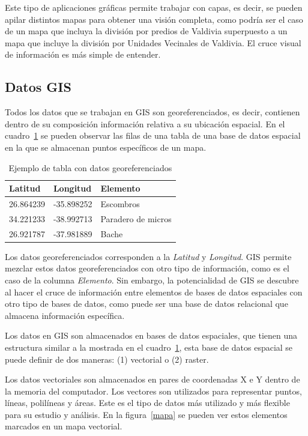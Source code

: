 Este tipo de aplicaciones gráficas permite trabajar con capas, es decir, se pueden apilar distintos
mapas para obtener una visión completa, como podría ser el caso de un mapa que incluya la división
por predios de Valdivia superpuesto a un mapa que incluye la división por Unidades Vecinales de
Valdivia. El cruce visual de información es más simple de entender.

\subsection{Datos GIS}
Todos los datos que se trabajan en GIS son georeferenciados, es decir, contienen dentro de su
composición información relativa a su ubicación espacial. En el cuadro~\ref{datosgeo} se pueden
observar las filas de una tabla de una base de datos espacial en la que se almacenan puntos
específicos de un mapa.

\begin{table}[h]
  \centering
  \caption{Ejemplo de tabla con datos georeferenciados}
  \label{datosgeo}
  \begin{tabular}{|l|l|l|}
    \hline
    \textbf{Latitud} &  \textbf{Longitud}  & \textbf{Elemento} \\ \hline
    26.864239 & -35.898252 & Escombros \\
    34.221233 & -38.992713 & Paradero de micros \\
    26.921787 & -37.981889 & Bache \\
    \hline
  \end{tabular}
\end{table}

Los datos georeferenciados corresponden a la \emph{Latitud} y \emph{Longitud}. GIS permite mezclar
estos datos georeferenciados con otro tipo de información, como es el caso de la columna
\emph{Elemento}. Sin embargo, la potencialidad de GIS se descubre al hacer el cruce de información
entre elementos de bases de datos espaciales con otro tipo de bases de datos, como puede ser una
base de datos relacional que almacena información específica.

Los datos en GIS son almacenados en bases de datos espaciales, que tienen una estructura similar a
la mostrada en el cuadro~\ref{datosgeo}, esta base de datos espacial se puede definir de dos
maneras: (1) vectorial o (2) raster.

Los datos vectoriales son almacenados en pares de coordenadas X e Y dentro de la memoria del
computador. Los vectores son utilizados para representar puntos, líneas, polilíneas y áreas. Este
es el tipo de datos más utilizado y más flexible para su estudio y análisis. En la figura~\ref{mapa}
se pueden ver estos elementos marcados en un mapa vectorial.

